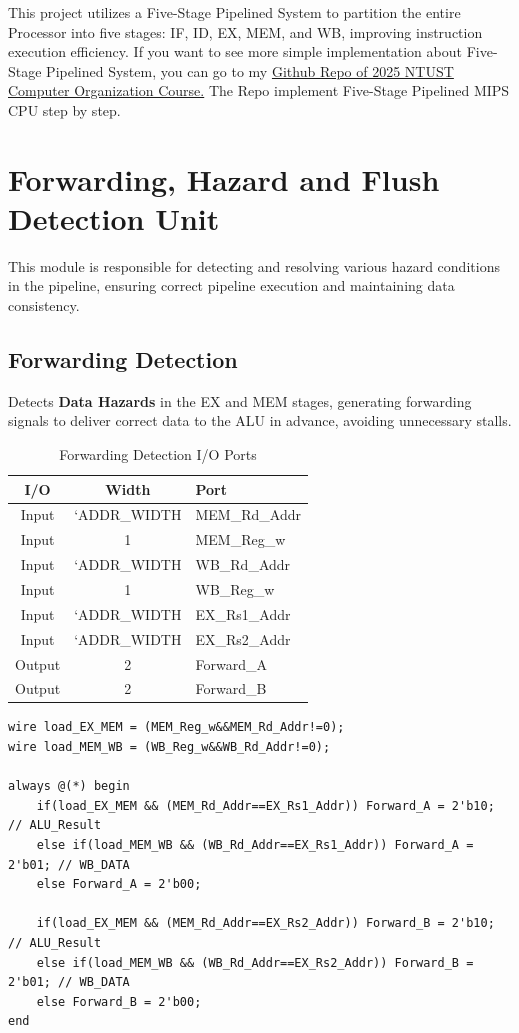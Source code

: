 \documentclass[12pt,a4paper]{report}
\begin{document}
This project utilizes a Five-Stage Pipelined System to partition the entire Processor into five stages: IF, ID, EX, MEM, and WB, improving instruction execution efficiency.
If you want to see more simple implementation about Five-Stage Pipelined System, you can go to my \href{https://github.com/akira2963753/mips-5stage-cpu}{Github Repo of 2025 NTUST Computer Organization Course.} The Repo implement Five-Stage Pipelined MIPS CPU step by step. 

\newpage
\section{Forwarding, Hazard and Flush Detection Unit}

This module is responsible for detecting and resolving various hazard conditions in the pipeline, ensuring correct pipeline execution and maintaining data consistency.

\subsection{Forwarding Detection}

Detects \textbf{Data Hazards} in the EX and MEM stages, generating forwarding signals to deliver correct data to the ALU in advance, avoiding unnecessary stalls.

\begin{table}[htbp]
\centering
\caption{Forwarding Detection I/O Ports}
\begin{tabular}{|c|c|l|}
\hline
\textbf{I/O} & \textbf{Width} & \textbf{Port} \\
\hline
Input & `ADDR\_WIDTH & MEM\_Rd\_Addr \\
Input & 1 & MEM\_Reg\_w \\
Input & `ADDR\_WIDTH & WB\_Rd\_Addr \\
Input & 1 & WB\_Reg\_w \\
Input & `ADDR\_WIDTH & EX\_Rs1\_Addr \\
Input & `ADDR\_WIDTH & EX\_Rs2\_Addr \\
Output & 2 & Forward\_A \\
Output & 2 & Forward\_B \\
\hline
\end{tabular}
\end{table}

\begin{lstlisting}[caption={Forwarding Detection Logic}]
wire load_EX_MEM = (MEM_Reg_w&&MEM_Rd_Addr!=0);
wire load_MEM_WB = (WB_Reg_w&&WB_Rd_Addr!=0);

always @(*) begin
    if(load_EX_MEM && (MEM_Rd_Addr==EX_Rs1_Addr)) Forward_A = 2'b10; // ALU_Result
    else if(load_MEM_WB && (WB_Rd_Addr==EX_Rs1_Addr)) Forward_A = 2'b01; // WB_DATA
    else Forward_A = 2'b00;

    if(load_EX_MEM && (MEM_Rd_Addr==EX_Rs2_Addr)) Forward_B = 2'b10; // ALU_Result
    else if(load_MEM_WB && (WB_Rd_Addr==EX_Rs2_Addr)) Forward_B = 2'b01; // WB_DATA
    else Forward_B = 2'b00;
end
\end{lstlisting}
\end{document}
